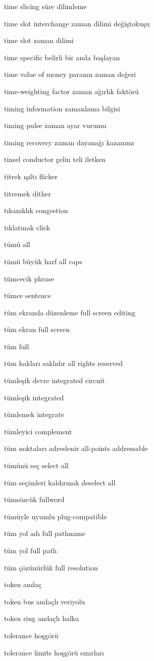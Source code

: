 \documentclass[12pt,fleqn]{article}\usepackage{../../common}
\begin{document}
time slicing süre dilimleme

time slot interchange zaman dilimi değiştokuşu

time slot zaman dilimi

time specific belirli bir anda başlayan

time value of money paranın zaman değeri

time-weighting factor zaman ağırlık faktörü

timing information zamanlama bilgisi

timing pulse zaman ayar vurumu

timing recovery zaman dayanağı kazanımı

tinsel conductor gelin teli iletken

titrek ışıltı flicker

titremek dither

tıkanıklık congestion

tıklatmak click

tümü all

tümü büyük harf all caps

tümcecik phrase

tümce sentence

tüm ekranda düzenleme full screen editing

tüm ekran full screen

tüm full

tüm hakları saklıdır all rights reserved

tümleşik devre integrated circuit

tümleşik integrated

tümlemek integrate

tümleyici complement

tüm noktaları adreslenir all-points addressable

tümünü seç select all

tüm seçimleri kaldırmak deselect all

tümsözcük fullword

tümüyle uyumlu plug-compatible

tüm yol adı full pathname

tüm yol full path

tüm çözünürlük full resolution

token andaç

token bus andaçlı veriyolu

token ring andaçlı halka

tolerance hoşgörü

tolerance limits hoşgörü sınırları
\end{document}
